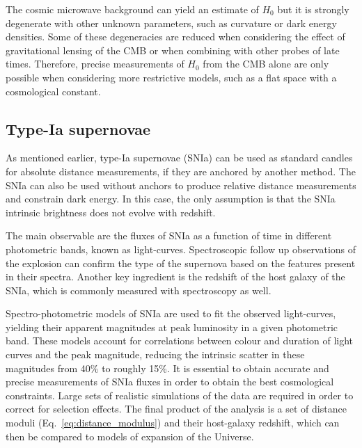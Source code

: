     The cosmic microwave background can yield an estimate of 
    $H_0$ but it is strongly degenerate with other unknown parameters, such as curvature
    or dark energy densities. Some of these degeneracies are reduced when considering 
    the effect of gravitational lensing of the CMB or when combining with other probes
    of late times. Therefore, precise measurements of $H_0$ from the CMB alone are only 
    possible when considering more restrictive models, such as a flat 
    space with a cosmological constant. 

    \subsection{Type-Ia supernovae}
    \label{intro:probes:snia}

    As mentioned earlier, type-Ia supernovae (SNIa) can be used as standard candles for 
    absolute distance measurements, if they are anchored by another method. 
    The SNIa can also be used without anchors to produce relative distance measurements and 
    constrain dark energy. In this case, the only assumption is
    that the SNIa intrinsic brightness does not evolve with redshift. 
     
    The main observable are the fluxes of SNIa as a function of time in different 
    photometric bands, known as light-curves. Spectroscopic follow up observations of 
    the explosion can confirm the type of the supernova based on the features
    present in their spectra. Another key ingredient is the redshift of the host 
    galaxy of the SNIa, which is commonly measured with spectroscopy as well.
    
    Spectro-photometric models of SNIa are used to fit the observed 
    light-curves, yielding their apparent magnitudes 
    at peak luminosity in a given photometric band. 
    These models account for correlations between colour and duration of light curves 
    and the peak magnitude, reducing the intrinsic scatter in these magnitudes from 
    40\% to roughly 15\%. 
    It is essential to obtain accurate and precise measurements 
    of SNIa fluxes in order to obtain the best cosmological constraints. 
    Large sets of realistic simulations of the data are required in order to 
    correct for selection effects. The final product of the analysis is a set
    of distance moduli (Eq.~\ref{eq:distance_modulus}) and their host-galaxy redshift, 
    which can then be compared to models of expansion of the Universe. 
    
